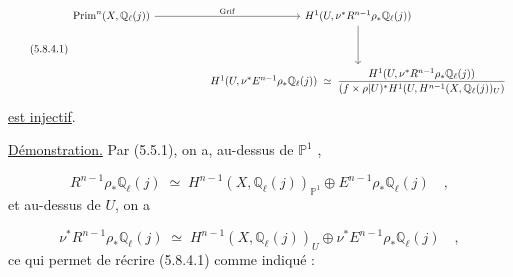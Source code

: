 \begin{equation}\tag{5.8.4.1}
\begin{tikzcd}[row sep=huge, column sep=huge]
\mathrm{Prim}^n(X,\mathbb{Q}_\ell(j)) \arrow[r, "\mathrm{Grif}"] & H^1(U,\nu^*R^{n-1}\rho_*\mathbb{Q}_\ell(j)) \arrow[d] \\
 {} & H^1(U,\nu^*E^{n-1}\rho_*\mathbb{Q}_\ell(j)) \;\simeq\; \dfrac{H^1(U,\nu^*R^{n-1}\rho_*\mathbb{Q}_\ell(j))}{(f\times\rho|U)^*H^1(U,H^{n-1}(X,\mathbb{Q}_\ell(j))_U)}
\end{tikzcd}
\end{equation}
\underline{est injectif}.



\underline{Démonstration.} Par (5.5.1), on a, au-dessus de $\mathbb{P}^1$ ,

\begin{equation}\tag{5.8.4.2}
R^{n-1}\rho_*\mathbb{Q}_\ell(j) \;\simeq\; H^{n-1}(X,\mathbb{Q}_\ell(j))_{\mathbb{P}^1} \oplus E^{n-1}\rho_*\mathbb{Q}_\ell(j) \quad ,
\end{equation}
et au-dessus de $U$, on a

\begin{equation}\tag{5.8.4.3}
\nu^*R^{n-1}\rho_*\mathbb{Q}_\ell(j) \;\simeq\; H^{n-1}(X,\mathbb{Q}_\ell(j))_U \oplus \nu^*E^{n-1}\rho_*\mathbb{Q}_\ell(j) \quad ,
\end{equation}
ce qui permet de récrire (5.8.4.1) comme indiqué :

